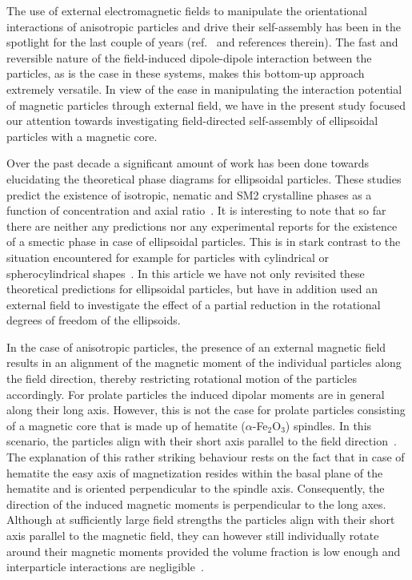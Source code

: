 \documentclass[aps,prl,preprint,superscriptaddress,showkeys]{revtex4-2} %
\begin{document}
The use of external electromagnetic fields to manipulate the orientational interactions of anisotropic particles and drive their self-assembly has been in the spotlight for the last couple of years (ref.~\cite{op2013phase, Schurtenberger2016, ganesan2017high, shah2015actuation} and references therein). The fast and reversible nature of the field-induced dipole-dipole interaction between the particles, as is the case in these systems, makes this bottom-up approach extremely versatile. In view of the ease in manipulating the interaction potential of magnetic particles through external field, we have in the present study focused our attention towards investigating field-directed self-assembly of ellipsoidal particles with a magnetic core.\par
Over the past decade a significant amount of work has been done towards elucidating the theoretical phase diagrams for ellipsoidal particles. These studies predict the existence of isotropic, nematic and SM2 crystalline phases as a function of concentration and axial ratio~\cite{radu2009solid, odriozola2012revisiting, pfleiderer2008crystal}. It is interesting to note that so far there are neither any predictions nor any experimental reports for the existence of a smectic phase in case of ellipsoidal particles. This is in stark contrast to the situation encountered for example for particles with cylindrical or spherocylindrical shapes~\cite{Bolhuis1997, lekkerkerker2013liquid}. In this article we have not only revisited these theoretical predictions for ellipsoidal particles, but have in addition used an external field to investigate the effect of a partial reduction in the rotational degrees of freedom of the ellipsoids.\par
In the case of anisotropic particles, the presence of an external magnetic field results in an alignment of the magnetic moment of the individual particles along the field direction, thereby restricting rotational motion of the particles accordingly. For prolate particles the induced dipolar moments are in general along their long axis. However, this is not the case for prolate particles consisting of a magnetic core that is made up of hematite ($\alpha$-Fe$_2$O$_3$) spindles. In this scenario, the particles align with their short axis parallel to the field direction~\cite{reufer2011magnetization,reufer2010morphology}. The explanation of this rather striking behaviour rests on the fact that in case of hematite the easy axis of magnetization resides within the basal plane of the hematite and is oriented perpendicular to the spindle axis. Consequently, the direction of the induced magnetic moments is perpendicular to the long axes. Although at sufficiently large field strengths the particles align with their short axis parallel to the magnetic field, they can however still individually rotate around their magnetic moments provided the volume fraction is low enough and interparticle interactions are negligible~\cite{reufer2010morphology}. \par
\end{document}
